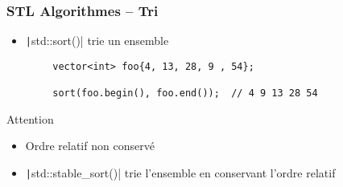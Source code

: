 \documentclass[C++.tex]{subfiles}
\begin{document}
\begin{frame}[fragile]
	\frametitle{STL Algorithmes -- Tri}
	\begin{itemize}
		\item \texttt|std::sort()| trie un ensemble
	\end{itemize}

	\begin{verbatim}
		vector<int> foo{4, 13, 28, 9 , 54};

		sort(foo.begin(), foo.end());  // 4 9 13 28 54
	\end{verbatim}

	\begin{alertblock}{Attention}
		\begin{itemize}
			\item Ordre relatif non conservé
		\end{itemize}
	\end{alertblock}

	\begin{itemize}
		\item \texttt|std::stable_sort()| trie l'ensemble en conservant l'ordre relatif
	\end{itemize}
\end{frame}
\end{document}
